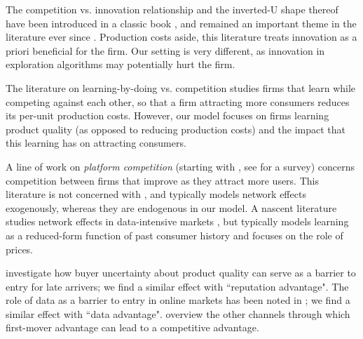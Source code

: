 

 The competition vs. innovation relationship and the inverted-U shape thereof have been introduced in a classic book \citep{Schumpeter-42}, and remained an important theme in the literature ever since \cite[\eg][]{aghion2005competition,Vives-08}. Production costs aside, this literature treats innovation as a priori beneficial for the firm. Our setting is very different, as innovation in exploration algorithms may potentially hurt the firm.

The literature on learning-by-doing vs. competition \citep[\eg][]{fudenberg1983learning, dasgupta1988learning, cabral1994learning} studies firms that learn while competing against each other, so that a firm attracting more consumers reduces its per-unit production costs. However, our model focuses on firms learning product quality (as opposed to reducing production costs) and the impact that this learning has on attracting consumers.

A line of work on \emph{platform competition} (starting with \cite{Rysman09}, see \citet{Weyl-White-14} for a survey) concerns competition between firms that improve as they attract more users. This literature is not concerned with \innovation, and typically models network effects exogenously, whereas they are endogenous in our model.
A nascent literature studies
network effects
in data-intensive markets \citep{prufer2017competing, hagiu2020data}, but typically models learning as a reduced-form function of past consumer history and focuses on the role of prices.

\cite{schmalensee1982product, bagwell1990informational} investigate how buyer uncertainty about product quality can serve as a barrier to entry for late arrivers; we find a similar effect with ``reputation advantage". The role of data as a barrier to entry in online markets has been noted in \cite{de2020data}; we find a similar effect with ``data advantage". \citet{kerin1992first} overview the other channels through which first-mover advantage can lead to a competitive advantage.



